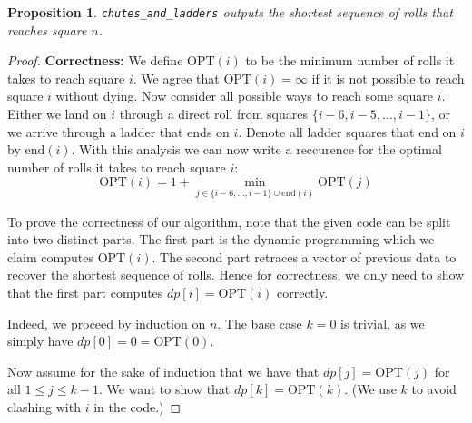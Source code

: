 \documentclass[10pt]{article}
\newtheorem{proposition}[lemma]{Proposition}
\newcommand{\OPT}{\text{OPT}}
\begin{document}
\begin{proposition}
  \texttt{chutes\_and\_ladders} outputs the shortest sequence of rolls that reaches square \(n\).
\end{proposition}

\begin{proof}
  \textbf{Correctness:} We define \(\OPT(i)\) to be the minimum number of rolls it takes to reach square \(i\). We agree that \(\OPT(i) = \infty\) if it is not possible to reach square \(i\) without dying. Now consider all possible ways to reach some square \(i\). Either we land on \(i\) through a direct roll from squares \(\{i - 6, i - 5, \ldots, i - 1\}\), or we arrive through a ladder that ends on \(i\). Denote all ladder squares that end on \(i\) by \(\text{end}(i)\). With this analysis we can now write a reccurence for the optimal number of rolls it takes to reach square \(i\): 
  \[\OPT(i) = 1 + \min_{j \in \{i - 6, \ldots, i - 1\} \cup \text{end}(i)}\OPT(j)\]

  To prove the correctness of our algorithm, note that the given code can be split into two distinct parts. The first part is the dynamic programming which we claim computes \(\OPT(i)\). The second part retraces a vector of previous data to recover the shortest sequence of rolls. Hence for correctness, we only need to show that the first part computes \(dp[i] = \OPT(i)\) correctly. 

  Indeed, we proceed by induction on \(n\). The base case \(k = 0\) is trivial, as we simply have \(dp[0] = 0 = \OPT(0)\). 

  Now assume for the sake of induction that we have that \(dp[j] = \OPT(j)\) for all \(1 \le j \le k - 1\). We want to show that \(dp[k] = \OPT(k)\). (We use \(k\) to avoid clashing with \(i\) in the code.)


\end{proof}
\end{document}
